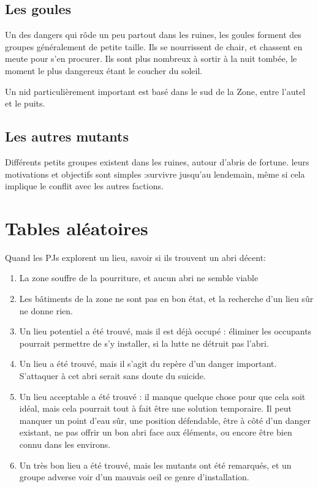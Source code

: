 \documentclass[10pt,a4paper]{article}
\begin{document}
\subsection{Les goules}
Un des dangers qui rôde un peu partout dans les ruines, les goules forment des groupes généralement de petite taille. Ils se nourrissent de chair, et chassent en meute pour s'en procurer. Ils sont plus nombreux à sortir à la nuit tombée, le moment le plus dangereux étant le coucher du soleil.

Un nid particulièrement important est basé dans le sud de la Zone, entre l'autel et le puits.
\subsection{Les autres mutants}
Différents petits groupes existent dans les ruines, autour d'abris de fortune. leurs motivations et objectifs sont simples :survivre jusqu'au lendemain, même si cela implique le conflit avec les autres factions.
\section{Tables aléatoires}
Quand les PJs explorent un lieu, savoir si ils trouvent un abri décent:
\begin{enumerate}
\item La zone souffre de la pourriture, et aucun abri ne semble viable
\item Les bâtiments de la zone ne sont pas en bon état, et la recherche d'un lieu sûr ne donne rien.
\item Un lieu potentiel a été trouvé, mais il est déjà occupé : éliminer les occupants pourrait permettre de s'y installer, si la lutte ne détruit pas l'abri.
\item Un lieu a été trouvé, mais il s'agit du repère d'un danger important. S'attaquer à cet abri serait sans doute du suicide.
\item Un lieu acceptable a été trouvé : il manque quelque chose pour que cela soit idéal, mais cela pourrait tout à fait être une solution temporaire. Il peut manquer un point d'eau sûr, une position défendable, être à côté d'un danger existant, ne pas offrir un bon abri face aux éléments, ou encore être bien connu dans les environs.
\item Un très bon lieu a été trouvé, mais les mutants ont été remarqués, et un groupe adverse voir d'un mauvais oeil ce genre d'installation.
\end{enumerate}
\end{document}
